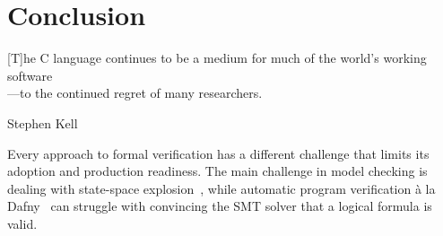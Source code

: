 \chapter{Conclusion}
\label{conclusion}

\epigraph{[T]he C language continues to be a medium for much of the world’s working software\\—to the continued regret of many researchers.}{Stephen Kell~\cite{kell2017some}}


Every approach to formal verification has a different challenge that limits its adoption and production readiness.
The main challenge in model checking is dealing with state-space explosion~\cite{Clarke2012}, while automatic program verification à la Dafny~\cite{leino2010dafny} can struggle with convincing the SMT solver that a logical formula is valid.

